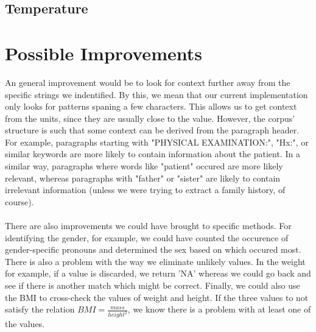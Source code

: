 \documentclass[10pt, a4paper, oneside]{article} %
\begin{document}
\subsection*{Temperature}

\section{Possible Improvements}
An general improvement would be to look for context further away from the specific strings we indentified. By this, we mean that our current implementation only looks for patterns spaning a few characters. This allows us to get context from the units, since they are usually close to the value. However, the corpus' structure is such that some context can be derived from the paragraph header. For example, paragraphs starting with "PHYSICAL EXAMINATION:", "Hx:", or similar keywords are more likely to contain information about the patient. In a similar way, paragraphs where words like "patient" occured are more likely relevant, whereas paragraphs with "father" or "sister" are likely to contain irrelevant information (unless we were trying to extract a family history, of course).\\
\\
There are also improvements we could have brought to specific methods. For identifying the gender, for example, we could have counted the occurence of gender-specific pronouns and determined the sex based on which occured most. There is also a problem with the way we eliminate unlikely values. In the weight for example, if a value is discarded, we return 'NA' whereas we could go back and see if there is another match which might be correct. Finally, we could also use the BMI to cross-check the values of weight and height. If the three values to not satisfy the relation $ BMI = \frac{mass}{height^2} $, we know there is a problem with at least one of the values.

\pagestyle{fancy} %

\pagebreak
%
%
%
%
%
%
%
%
%
%
%
%
%
%
\end{document}
